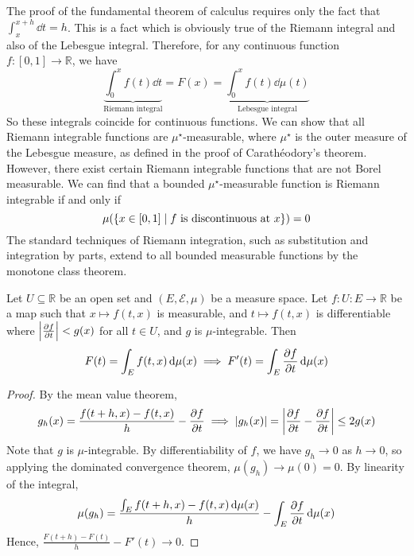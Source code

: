 \begin{remark}
	The proof of the fundamental theorem of calculus requires only the fact that \( \int_x^{x + h} \dd{t} = h \).
	This is a fact which is obviously true of the Riemann integral and also of the Lebesgue integral.
	Therefore, for any continuous function \( f \colon [0,1] \to \mathbb R \), we have
	\[ \underbrace{\int_0^x f(t) \dd{t}}_{\text{Riemann integral}} = F(x) = \underbrace{\int_0^x f(t) \dd{\mu(t)}}_{\text{Lebesgue integral}} \]
	So these integrals coincide for continuous functions.
	We can show that all Riemann integrable functions are \( \mu^\star \)-measurable, where \( \mu^\star \) is the outer measure of the Lebesgue measure, as defined in the proof of Carath\'eodory's theorem.
	However, there exist certain Riemann integrable functions that are not Borel measurable.
	We can find that a bounded \( \mu^\star \)-measurable function is Riemann integrable if and only if
	\[ \mu\qty(\qty{x \in [0,1] \mid f \text{ is discontinuous at } x}) = 0 \]
	The standard techniques of Riemann integration, such as substitution and integration by parts, extend to all bounded measurable functions by the monotone class theorem.
\end{remark}
\begin{theorem}
	Let \( U \subseteq \mathbb R \) be an open set and \( (E, \mathcal E, \mu) \) be a measure space.
	Let \( f \colon U \colon E \to \mathbb R \) be a map such that \( x \mapsto f(t, x) \) is measurable, and \( t \mapsto f(t,x) \) is differentiable where \( \abs{\pdv{f}{t}} < g(x) \) for all \( t \in U \), and \( g \) is \( \mu \)-integrable.
	Then
	\[ F(t) = \int_E f(t,x) \dd{\mu(x)} \implies F'(t) = \int_E \pdv{f}{t}(t,x) \dd{\mu(x)} \]
\end{theorem}
\begin{proof}
	By the mean value theorem,
	\[ g_h(x) = \frac{f(t + h, x) - f(t, x)}{h} - \pdv{f}{t}(t,x) \implies \abs{g_h(x)} = \abs{\pdv{f}{t}(\widetilde t, x) - \pdv{f}{t}(t, x)} \leq 2g(x) \]
	Note that \( g \) is \( \mu \)-integrable.
	By differentiability of \( f \), we have \( g_h \to 0 \) as \( h \to 0 \), so applying the dominated convergence theorem, \( \mu(g_h) \to \mu(0) = 0 \).
	By linearity of the integral,
	\[ \mu(g_h) = \frac{\int_E f(t + h, x) - f(t, x) \dd{\mu(x)}}{h} - \int_E \pdv{f}{t}(t,x) \dd{\mu(x)} \]
	Hence, \( \frac{F(t+h) - F(t)}{h} - F'(t) \to 0 \).
\end{proof}
